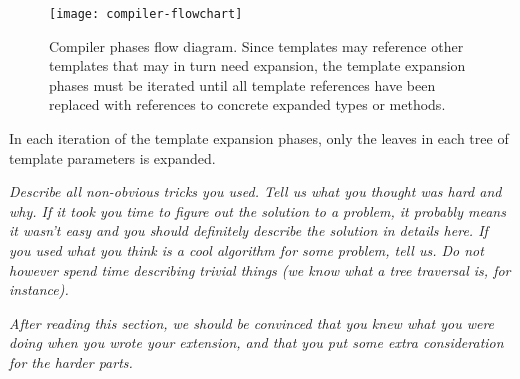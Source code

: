 \begin{figure}[hbtp]
  \texttt{[image: compiler-flowchart]}
  \caption{Compiler phases flow diagram. Since templates may reference other templates that may in
    turn need expansion, the template expansion phases must be iterated until all template
    references have been replaced with references to concrete expanded types or methods.}
  \label{fig:compiler-flowchart}
\end{figure}

In each iteration of the template expansion phases, only the leaves in each tree of template
parameters is expanded.


\emph{Describe all non-obvious tricks you used. Tell us what you thought was hard and
why. If it took you time to figure out the solution to a problem, it probably
means it wasn't easy and you should definitely describe the solution in details
here. If you used what you think is a cool algorithm for some problem, tell us.
Do not however spend time describing trivial things (we know what a tree traversal
is, for instance).}

\emph{After reading this section, we should be convinced that you knew what you were
doing when you wrote your extension, and that you put some extra consideration
for the harder parts.}
